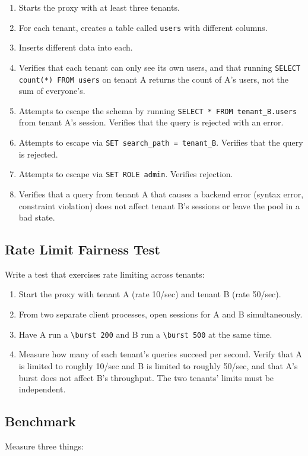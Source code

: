 \documentclass[11pt,a4paper]{article}
\begin{document}
\begin{enumerate}
\item Starts the proxy with at least three tenants.
\item For each tenant, creates a table called \texttt{users} with different columns.
\item Inserts different data into each.
\item Verifies that each tenant can only see its own users, and that running \texttt{SELECT count(*) FROM users} on tenant A returns the count of A's users, not the sum of everyone's.
\item Attempts to escape the schema by running \texttt{SELECT * FROM tenant\_B.users} from tenant A's session. Verifies that the query is rejected with an error.
\item Attempts to escape via \texttt{SET search\_path = tenant\_B}. Verifies that the query is rejected.
\item Attempts to escape via \texttt{SET ROLE admin}. Verifies rejection.
\item Verifies that a query from tenant A that causes a backend error (syntax error, constraint violation) does not affect tenant B's sessions or leave the pool in a bad state.
\end{enumerate}

\subsection{Rate Limit Fairness Test}
Write a test that exercises rate limiting across tenants:

\begin{enumerate}
\item Start the proxy with tenant A (rate 10/sec) and tenant B (rate 50/sec).
\item From two separate client processes, open sessions for A and B simultaneously.
\item Have A run a \verb|\burst 200| and B run a \verb|\burst 500| at the same time.
\item Measure how many of each tenant's queries succeed per second. Verify that A is limited to roughly 10/sec and B is limited to roughly 50/sec, and that A's burst does not affect B's throughput. The two tenants' limits must be independent.
\end{enumerate}

\subsection{Benchmark}
Measure three things:
\end{document}

